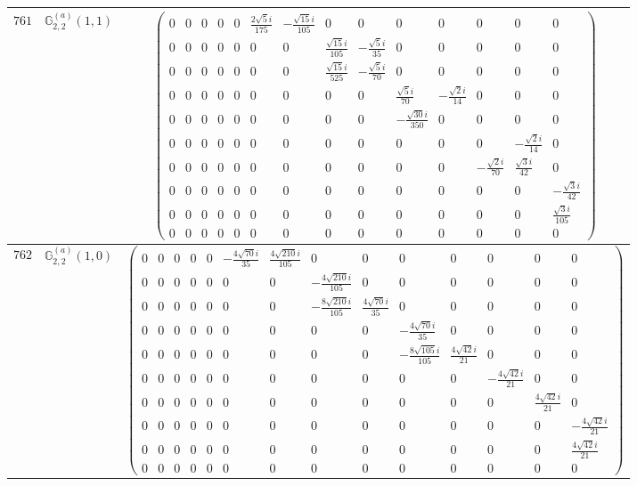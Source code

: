 \documentclass[fleqn,8pt,landscape]{jsarticle}
\begin{document}
\begin{center}
\begin{longtable}{ccc}
$ 761 $ & $ \mathbb{G}_{2,2}^{(a)}(1,1) $ & $ \begin{pmatrix} 0 & 0 & 0 & 0 & 0 & \frac{2 \sqrt{5} i}{175} & - \frac{\sqrt{15} i}{105} & 0 & 0 & 0 & 0 & 0 & 0 & 0 \\ 0 & 0 & 0 & 0 & 0 & 0 & 0 & \frac{\sqrt{15} i}{105} & - \frac{\sqrt{5} i}{35} & 0 & 0 & 0 & 0 & 0 \\ 0 & 0 & 0 & 0 & 0 & 0 & 0 & \frac{\sqrt{15} i}{525} & - \frac{\sqrt{5} i}{70} & 0 & 0 & 0 & 0 & 0 \\ 0 & 0 & 0 & 0 & 0 & 0 & 0 & 0 & 0 & \frac{\sqrt{5} i}{70} & - \frac{\sqrt{2} i}{14} & 0 & 0 & 0 \\ 0 & 0 & 0 & 0 & 0 & 0 & 0 & 0 & 0 & - \frac{\sqrt{30} i}{350} & 0 & 0 & 0 & 0 \\ 0 & 0 & 0 & 0 & 0 & 0 & 0 & 0 & 0 & 0 & 0 & 0 & - \frac{\sqrt{2} i}{14} & 0 \\ 0 & 0 & 0 & 0 & 0 & 0 & 0 & 0 & 0 & 0 & 0 & - \frac{\sqrt{2} i}{70} & \frac{\sqrt{3} i}{42} & 0 \\ 0 & 0 & 0 & 0 & 0 & 0 & 0 & 0 & 0 & 0 & 0 & 0 & 0 & - \frac{\sqrt{3} i}{42} \\ 0 & 0 & 0 & 0 & 0 & 0 & 0 & 0 & 0 & 0 & 0 & 0 & 0 & \frac{\sqrt{3} i}{105} \\ 0 & 0 & 0 & 0 & 0 & 0 & 0 & 0 & 0 & 0 & 0 & 0 & 0 & 0 \end{pmatrix} $ \\ \hline
$ 762 $ & $ \mathbb{G}_{2,2}^{(a)}(1,0) $ & $ \begin{pmatrix} 0 & 0 & 0 & 0 & 0 & - \frac{4 \sqrt{70} i}{35} & \frac{4 \sqrt{210} i}{105} & 0 & 0 & 0 & 0 & 0 & 0 & 0 \\ 0 & 0 & 0 & 0 & 0 & 0 & 0 & - \frac{4 \sqrt{210} i}{105} & 0 & 0 & 0 & 0 & 0 & 0 \\ 0 & 0 & 0 & 0 & 0 & 0 & 0 & - \frac{8 \sqrt{210} i}{105} & \frac{4 \sqrt{70} i}{35} & 0 & 0 & 0 & 0 & 0 \\ 0 & 0 & 0 & 0 & 0 & 0 & 0 & 0 & 0 & - \frac{4 \sqrt{70} i}{35} & 0 & 0 & 0 & 0 \\ 0 & 0 & 0 & 0 & 0 & 0 & 0 & 0 & 0 & - \frac{8 \sqrt{105} i}{105} & \frac{4 \sqrt{42} i}{21} & 0 & 0 & 0 \\ 0 & 0 & 0 & 0 & 0 & 0 & 0 & 0 & 0 & 0 & 0 & - \frac{4 \sqrt{42} i}{21} & 0 & 0 \\ 0 & 0 & 0 & 0 & 0 & 0 & 0 & 0 & 0 & 0 & 0 & 0 & \frac{4 \sqrt{42} i}{21} & 0 \\ 0 & 0 & 0 & 0 & 0 & 0 & 0 & 0 & 0 & 0 & 0 & 0 & 0 & - \frac{4 \sqrt{42} i}{21} \\ 0 & 0 & 0 & 0 & 0 & 0 & 0 & 0 & 0 & 0 & 0 & 0 & 0 & \frac{4 \sqrt{42} i}{21} \\ 0 & 0 & 0 & 0 & 0 & 0 & 0 & 0 & 0 & 0 & 0 & 0 & 0 & 0 \end{pmatrix} $ \\ \hline

\end{longtable}
\end{center}
\end{document}

